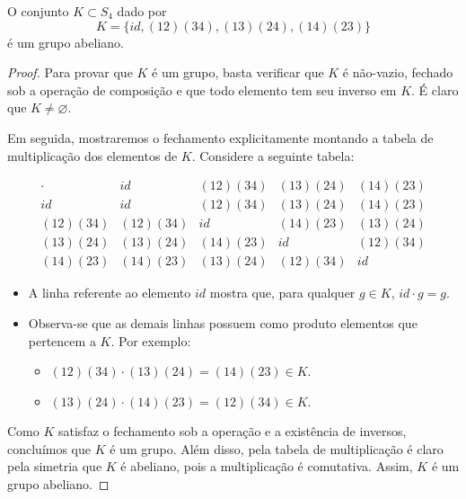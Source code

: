 \documentclass[11pt,openany]{book}
\begin{document}
\begin{proposition}
    O conjunto $K \subset S_4$ dado por\
    \[K = \{id, (12)(34), (13)(24), (14)(23)\}\]
    é um grupo abeliano.
\end{proposition}

\begin{proof}
    Para provar que \(K\) é um grupo, basta verificar que \(K\) é não-vazio, fechado sob a operação de composição e que todo elemento tem seu inverso em \(K\). É claro que \(K \neq \varnothing\).

    Em seguida, mostraremos o fechamento explicitamente montando a tabela de multiplicação dos elementos de \(K\). Considere a seguinte tabela:

    \[
    \begin{array}{c|cccc}
       \cdot       & id              & (12)(34)      & (13)(24)      & (14)(23)\\ \hline
       id          & id              & (12)(34)      & (13)(24)      & (14)(23) \\
       (12)(34)    & (12)(34)       & id            & (14)(23)      & (13)(24) \\
       (13)(24)    & (13)(24)       & (14)(23)     & id            & (12)(34) \\
       (14)(23)    & (14)(23)       & (13)(24)     & (12)(34)     & id
    \end{array}
    \]

    \begin{itemize}
      \item A linha referente ao elemento \(id\) mostra que, para qualquer \(g \in K\), \(id \cdot g = g\).
      \item Observa-se que as demais linhas possuem como produto elementos que pertencem a \(K\). Por exemplo:
        \begin{itemize}
          \item \((12)(34) \cdot (13)(24) = (14)(23) \in K\).
          \item \((13)(24) \cdot (14)(23) = (12)(34) \in K\).
        \end{itemize}
    \end{itemize}

    Como \(K\) satisfaz o fechamento sob a operação e a existência de inversos, concluímos que \(K\) é um grupo. Além disso, pela tabela de multiplicação é claro pela simetria que \(K\) é abeliano, pois a multiplicação é comutativa. Assim, \(K\) é um grupo abeliano.
\end{proof}
\end{document}
